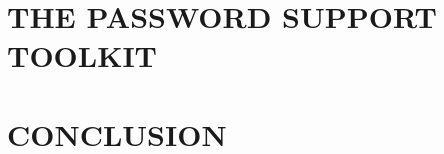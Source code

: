 \documentclass[12pt,a4paper]{book}
\begin{document}
\part{THE PASSWORD SUPPORT TOOLKIT}



%
%

\part{CONCLUSION}


%


\cleardoublepage


\backmatter




%



\cleardoublepage
\end{document}

